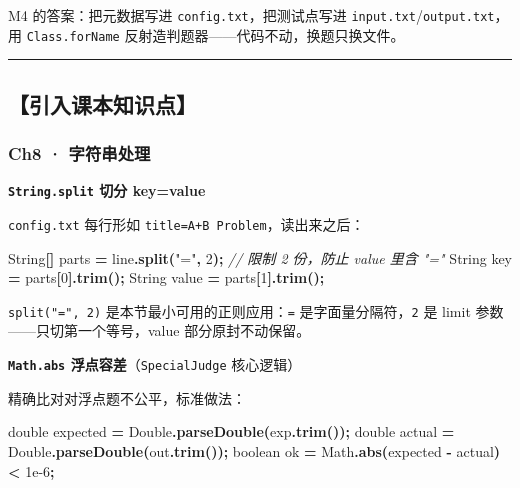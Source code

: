 \documentclass[
  11pt,
]{ctexart}
\newenvironment{Shaded}{\begin{snugshade}}{\end{snugshade}}
\newcommand{\BuiltInTok}[1]{#1}
\newcommand{\CommentTok}[1]{\textcolor[rgb]{0.56,0.35,0.01}{\textit{#1}}}
\newcommand{\DataTypeTok}[1]{\textcolor[rgb]{0.13,0.29,0.53}{#1}}
\newcommand{\DecValTok}[1]{\textcolor[rgb]{0.00,0.00,0.81}{#1}}
\newcommand{\FloatTok}[1]{\textcolor[rgb]{0.00,0.00,0.81}{#1}}
\newcommand{\FunctionTok}[1]{\textcolor[rgb]{0.13,0.29,0.53}{\textbf{#1}}}
\newcommand{\NormalTok}[1]{#1}
\newcommand{\OperatorTok}[1]{\textcolor[rgb]{0.81,0.36,0.00}{\textbf{#1}}}
\newcommand{\StringTok}[1]{\textcolor[rgb]{0.31,0.60,0.02}{#1}}
\begin{document}
M4 的答案：把元数据写进 \texttt{config.txt}，把测试点写进
\texttt{input.txt}/\texttt{output.txt}，用 \texttt{Class.forName}
反射造判题器------代码不动，换题只换文件。

\begin{center}\rule{0.5\linewidth}{0.5pt}\end{center}

\hypertarget{ux5f15ux5165ux8bfeux672cux77e5ux8bc6ux70b9}{%
\subsection{【引入课本知识点】}\label{ux5f15ux5165ux8bfeux672cux77e5ux8bc6ux70b9}}

\hypertarget{ch8-ux5b57ux7b26ux4e32ux5904ux7406}{%
\subsubsection{Ch8 ·
字符串处理}\label{ch8-ux5b57ux7b26ux4e32ux5904ux7406}}

\textbf{\texttt{String.split} 切分 key=value}

\texttt{config.txt} 每行形如 \texttt{title=A+B\ Problem}，读出来之后：

\begin{Shaded}
\begin{Highlighting}[]
\BuiltInTok{String}\OperatorTok{[]}\NormalTok{ parts }\OperatorTok{=}\NormalTok{ line}\OperatorTok{.}\FunctionTok{split}\OperatorTok{(}\StringTok{"="}\OperatorTok{,} \DecValTok{2}\OperatorTok{);}   \CommentTok{// 限制 2 份，防止 value 里含 "="}
\BuiltInTok{String}\NormalTok{ key   }\OperatorTok{=}\NormalTok{ parts}\OperatorTok{[}\DecValTok{0}\OperatorTok{].}\FunctionTok{trim}\OperatorTok{();}
\BuiltInTok{String}\NormalTok{ value }\OperatorTok{=}\NormalTok{ parts}\OperatorTok{[}\DecValTok{1}\OperatorTok{].}\FunctionTok{trim}\OperatorTok{();}
\end{Highlighting}
\end{Shaded}

\texttt{split("=",\ 2)} 是本节最小可用的正则应用：\texttt{=}
是字面量分隔符，\texttt{2} 是 limit 参数------只切第一个等号，value
部分原封不动保留。

\textbf{\texttt{Math.abs} 浮点容差}（\texttt{SpecialJudge} 核心逻辑）

精确比对对浮点题不公平，标准做法：

\begin{Shaded}
\begin{Highlighting}[]
\DataTypeTok{double}\NormalTok{ expected }\OperatorTok{=} \BuiltInTok{Double}\OperatorTok{.}\FunctionTok{parseDouble}\OperatorTok{(}\NormalTok{exp}\OperatorTok{.}\FunctionTok{trim}\OperatorTok{());}
\DataTypeTok{double}\NormalTok{ actual   }\OperatorTok{=} \BuiltInTok{Double}\OperatorTok{.}\FunctionTok{parseDouble}\OperatorTok{(}\NormalTok{out}\OperatorTok{.}\FunctionTok{trim}\OperatorTok{());}
\DataTypeTok{boolean}\NormalTok{ ok }\OperatorTok{=} \BuiltInTok{Math}\OperatorTok{.}\FunctionTok{abs}\OperatorTok{(}\NormalTok{expected }\OperatorTok{{-}}\NormalTok{ actual}\OperatorTok{)} \OperatorTok{\textless{}} \FloatTok{1e{-}6}\OperatorTok{;}
\end{Highlighting}
\end{Shaded}
\end{document}
